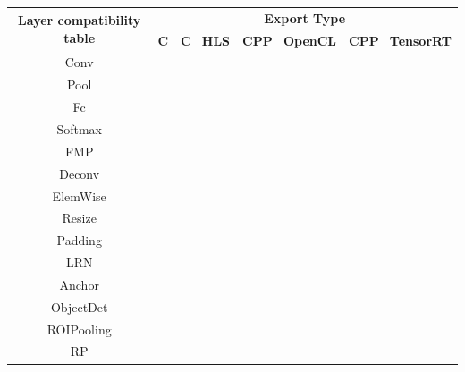 \documentclass[a4paper,11pt,oneside]{article}
\newcommand{\cmark}{\ding{51}}%
\newcommand{\xmark}{\ding{55}}%
\begin{document}
\begin{table}[htbp]
\centering
\renewcommand\arraystretch{1.2}
\begin{tabular}{|c|c|c|c|c|}\hline
\multirow{2}{*}{\bfseries Layer compatibility table}
    & \multicolumn{4}{c|}{\bfseries Export Type}    \\
    \cline{2-5}
    & \ttfamily\bfseries C & \ttfamily\bfseries C\_HLS & \ttfamily\bfseries CPP\_OpenCL & \ttfamily\bfseries CPP\_TensorRT            \\
  \hline
  Conv
    & \textcolor{green}\cmark & \textcolor{green}\cmark & \textcolor{green}\cmark & \textcolor{green}\cmark \\
  \hline
  Pool
    & \textcolor{green}\cmark & \textcolor{green}\cmark & \textcolor{green}\cmark & \textcolor{green}\cmark \\
  \hline
  Fc
    & \textcolor{green}\cmark & \textcolor{green}\cmark & \textcolor{green}\cmark & \textcolor{green}\cmark \\
  \hline
  Softmax
    & \textcolor{green}\cmark & \textcolor{red}\xmark & \textcolor{green}\cmark & \textcolor{green}\cmark \\
  \hline
  FMP
    & \textcolor{green}\cmark & \textcolor{red}\xmark & \textcolor{green}\cmark & \textcolor{red}\xmark \\
  \hline
  Deconv
    & \textcolor{red}\xmark & \textcolor{red}\xmark & \textcolor{red}\xmark & \textcolor{green}\cmark \\
  \hline
  ElemWise
    & \textcolor{red}\xmark & \textcolor{red}\xmark & \textcolor{red}\xmark & \textcolor{green}\cmark \\
  \hline
  Resize
    & \textcolor{green}\cmark & \textcolor{red}\xmark & \textcolor{red}\xmark & \textcolor{green}\cmark \\
  \hline
  Padding
    & \textcolor{red}\xmark & \textcolor{red}\xmark & \textcolor{red}\xmark & \textcolor{green}\cmark \\
  \hline
  LRN
    & \textcolor{red}\xmark & \textcolor{red}\xmark & \textcolor{red}\xmark & \textcolor{green}\cmark \\
  \hline
  Anchor
    & \textcolor{red}\xmark & \textcolor{red}\xmark & \textcolor{red}\xmark & \textcolor{green}\cmark \\
  \hline
  ObjectDet
    & \textcolor{red}\xmark & \textcolor{red}\xmark & \textcolor{red}\xmark & \textcolor{green}\cmark \\
  \hline
  ROIPooling
    & \textcolor{red}\xmark & \textcolor{red}\xmark & \textcolor{red}\xmark & \textcolor{green}\cmark \\
  \hline
  RP
    & \textcolor{red}\xmark & \textcolor{red}\xmark & \textcolor{red}\xmark & \textcolor{green}\cmark \\
  \hline

\end{tabular}
\end{table}
\end{document}
